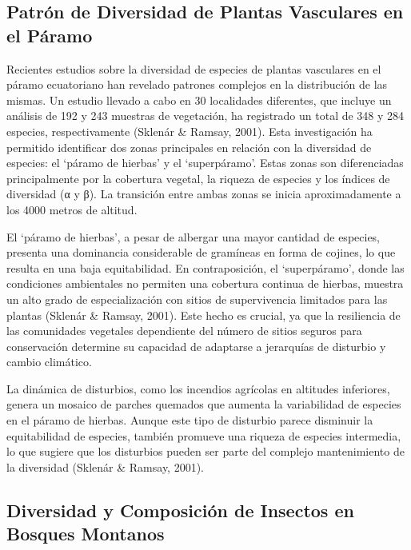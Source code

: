 \documentclass[
  letterpaper,
  DIV=11,
  numbers=noendperiod,
  oneside]{scrreprt}
\begin{document}
\subsection{Patrón de Diversidad de Plantas Vasculares en el
Páramo}\label{patruxf3n-de-diversidad-de-plantas-vasculares-en-el-puxe1ramo}

Recientes estudios sobre la diversidad de especies de plantas vasculares
en el páramo ecuatoriano han revelado patrones complejos en la
distribución de las mismas. Un estudio llevado a cabo en 30 localidades
diferentes, que incluye un análisis de 192 y 243 muestras de vegetación,
ha registrado un total de 348 y 284 especies, respectivamente (Sklenár
\& Ramsay, 2001). Esta investigación ha permitido identificar dos zonas
principales en relación con la diversidad de especies: el `páramo de
hierbas' y el `superpáramo'. Estas zonas son diferenciadas
principalmente por la cobertura vegetal, la riqueza de especies y los
índices de diversidad (α y β). La transición entre ambas zonas se inicia
aproximadamente a los 4000 metros de altitud.

El `páramo de hierbas', a pesar de albergar una mayor cantidad de
especies, presenta una dominancia considerable de gramíneas en forma de
cojines, lo que resulta en una baja equitabilidad. En contraposición, el
`superpáramo', donde las condiciones ambientales no permiten una
cobertura continua de hierbas, muestra un alto grado de especialización
con sitios de supervivencia limitados para las plantas (Sklenár \&
Ramsay, 2001). Este hecho es crucial, ya que la resiliencia de las
comunidades vegetales dependiente del número de sitios seguros para
conservación determine su capacidad de adaptarse a jerarquías de
disturbio y cambio climático.

La dinámica de disturbios, como los incendios agrícolas en altitudes
inferiores, genera un mosaico de parches quemados que aumenta la
variabilidad de especies en el páramo de hierbas. Aunque este tipo de
disturbio parece disminuir la equitabilidad de especies, también
promueve una riqueza de especies intermedia, lo que sugiere que los
disturbios pueden ser parte del complejo mantenimiento de la diversidad
(Sklenár \& Ramsay, 2001).

\subsection{Diversidad y Composición de Insectos en Bosques
Montanos}\label{diversidad-y-composiciuxf3n-de-insectos-en-bosques-montanos}
\end{document}
